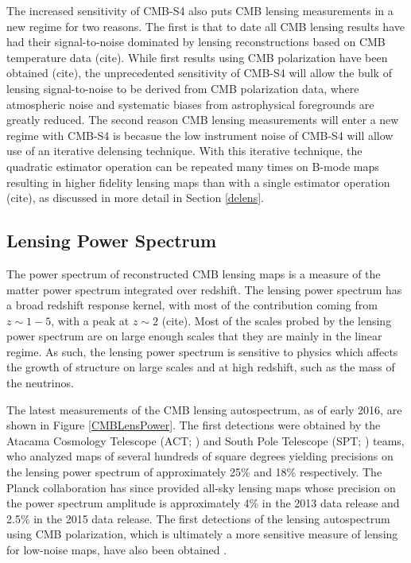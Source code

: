 The increased sensitivity of CMB-S4 also puts CMB lensing measurements in a new regime for two reasons.  The first is that to date all CMB lensing results have had their signal-to-noise dominated by lensing reconstructions based on CMB temperature data (cite).  While first results using CMB polarization have been obtained (cite), the unprecedented sensitivity of CMB-S4 will allow the bulk of lensing signal-to-noise to be derived from CMB polarization data, where atmospheric noise and systematic biases from astrophysical foregrounds are greatly reduced.  The second reason CMB lensing measurements will enter a new regime with CMB-S4 is becasue the low instrument noise of CMB-S4 will allow use of an iterative delensing technique.  With this iterative technique, the quadratic estimator operation can be repeated many times on B-mode maps resulting in higher fidelity lensing maps than with a single estimator operation (cite), as discussed in more detail in Section \ref{delens}.   





\subsection{Lensing Power Spectrum}\label{kappaPower}

The power spectrum of reconstructed CMB lensing maps is a measure of the matter power spectrum integrated over redshift.  The lensing power spectrum has a broad redshift response kernel, with most of the contribution coming from $z\sim 1-5$, with a peak at $z\sim 2$ (cite).  
Most of the scales probed by the lensing power spectrum are on large enough scales that they are mainly in the linear regime.  As such, the lensing power spectrum is sensitive to physics which affects the growth of structure on large scales and at high redshift, such as the mass of the neutrinos. 

The latest measurements of the CMB lensing autospectrum, as of early 2016, are shown in Figure \ref{CMBLensPower}. The first detections were obtained by the Atacama Cosmology Telescope (ACT; \cite{das/etal/2011}) and South Pole Telescope  (SPT; \cite{vanengelen/etal/2012}) teams, who analyzed maps of several hundreds of square degrees yielding precisions on the lensing power spectrum of approximately 25\% and 18\% respectively.  The Planck collaboration has since provided all-sky lensing maps whose precision on the power spectrum amplitude is approximately 4\% in the 2013 data release and 2.5\% in the 2015 data release.  The first detections of the lensing autospectrum using CMB polarization, which is ultimately a more sensitive measure of lensing for low-noise maps,  have also been obtained \cite{story/etal/2013, polarbear/lensing//2014}.

